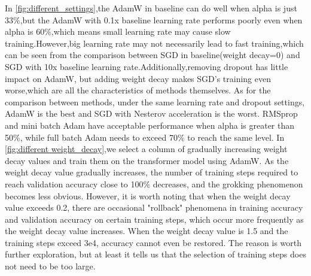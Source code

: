 In \cref{fig:different_settings},the AdamW in baseline can do well when alpha is just 33\%,but the AdamW with 0.1x baseline learning rate performs poorly even when alpha is 60\%,which means small learning rate may cause slow training.However,big learning rate may not necessarily lead to fast training,which can be seen from the comparison between SGD in baseline(weight decay=0) and SGD with 10x baseline learning rate.Additionally,removing dropout has little impact on AdamW, but adding weight decay makes SGD's training even worse,which are all the characteristics of methods themselves.
As for the comparison between methods, under the same learning rate and dropout settings, AdamW is the best and SGD with Nesterov acceleration is the worst. RMSprop and mini batch Adam have acceptable performance when alpha is greater than 50\%, while full batch Adam needs to exceed 70\% to reach the same level.
In \cref{fig:different weight_decay},we select a column of gradually increasing weight decay values and train them on the transformer model using AdamW. As the weight decay value gradually increases, the number of training steps required to reach validation accuracy close to 100\% decreases, and the grokking phenomenon becomes less obvious. However, it is worth noting that when the weight decay value exceeds 0.2, there are occasional "rollback" phenomena in training accuracy and validation accuracy on certain training steps, which occur more frequently as the weight decay value increases. When the weight decay value is 1.5 and the training steps exceed 3e4, accuracy cannot even be restored. The reason is worth further exploration, but at least it tells us that the selection of training steps does not need to be too large.